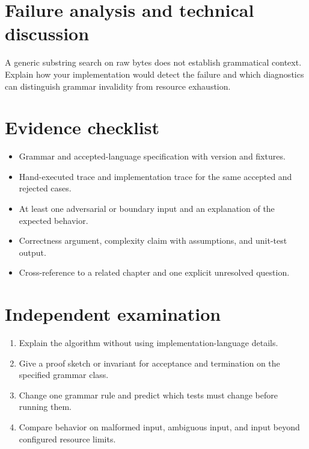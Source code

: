 \documentclass[11pt,letterpaper]{article}
\begin{document}
\section{Failure analysis and technical discussion}
A generic substring search on raw bytes does not establish grammatical context. Explain how your implementation would detect the failure and which diagnostics can distinguish grammar invalidity from resource exhaustion.
\section{Evidence checklist}
\begin{itemize}
\item Grammar and accepted-language specification with version and fixtures.
\item Hand-executed trace and implementation trace for the same accepted and rejected cases.
\item At least one adversarial or boundary input and an explanation of the expected behavior.
\item Correctness argument, complexity claim with assumptions, and unit-test output.
\item Cross-reference to a related chapter and one explicit unresolved question.
\end{itemize}
\section{Independent examination}
\begin{enumerate}
\item Explain the algorithm without using implementation-language details.
\item Give a proof sketch or invariant for acceptance and termination on the specified grammar class.
\item Change one grammar rule and predict which tests must change before running them.
\item Compare behavior on malformed input, ambiguous input, and input beyond configured resource limits.
\end{enumerate}
\end{document}
